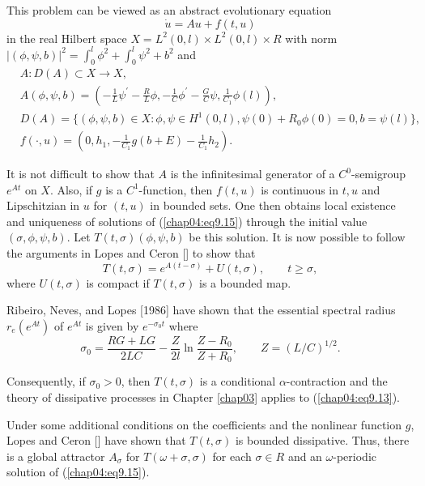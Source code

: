 \documentclass{surv-l}
\theoremstyle{plain}
\theoremstyle{definition}
\numberwithin{equation}{section}
\numberwithin{figure}{chapter}
\begin{document}
This problem can be viewed as an abstract evolutionary equation
\begin{equation}\label{chap04:eq9.15}
\dot{u}=Au+f(t, u)
\end{equation}
in the real Hilbert space $X=L^{2}(0, l)\times L^{2}(0, l)\times R$ with norm $|(\phi, \psi, b)|^{2}= \int_{0}^{l}\phi^{2}+\int_{0}^{l}\psi^{2}+b^{2}$ and
\begin{align*}
& A: D(A)\subset X\rightarrow X,\\
& A(\phi, \psi, b)=\left(-\frac{1}{L}\psi^{\prime} -\frac{R}{L}\phi, -\frac{1}{C}\phi^{\prime} -\frac{G}{C}\psi, \frac{1}{C_{1}}\phi(l)\right),\\
& D(A)=\{(\phi, \psi, b)\in X: \phi, \psi\in H^{1}(0, l), \psi(0)+R_{0}\phi(0)=0, b=\psi(l)\},\\
& f(\cdot, u)=\left(0, h_{1}, -\frac{1}{C_{1}}g(b+E)-\frac{1}{C_{1}}h_{2}\right).
\end{align*}

It is not difficult to show that $A$ is the infinitesimal generator of a $C^{0}$-semigroup $e^{At}$ on $X$. Also, if $g$ is a $C^{1}$-function, then $f(t, u)$ is continuous in $t, u$ and Lipschitzian in $u$ for $(t, u)$ in bounded sets. One then obtains local existence and uniqueness of solutions of (\ref{chap04:eq9.15}) through the initial value $(\sigma, \phi, \psi, b)$. Let $T(t, \sigma)(\phi, \psi, b)$ be this solution. It is now possible to follow the arguments in Lopes and Ceron [\citeyear{1984lc}] to show that
\begin{equation*}
T(t, \sigma)=e^{A(t-\sigma)}+U(t, \sigma),\qquad t\geq\sigma,
\end{equation*}
where $U(t, \sigma)$ is compact if $T(t, \sigma)$ is a bounded map.

Ribeiro, Neves, and Lopes [1986] have shown that the essential spectral radius $r_{e}(e^{At})$ of $e^{At}$ is given by $e^{-\sigma_{0}t}$ where
\begin{equation*}
\sigma_{0}=\frac{RG+LG}{2LC}-\frac{Z}{2l}\ln\frac{Z-R_{0}}{Z+R_{0}},\qquad Z=(L/C)^{1/2}.
\end{equation*}

Consequently, if $\sigma_{0}>0$, then $T(t, \sigma)$ is a conditional $\alpha$-contraction and the theory of dissipative processes in Chapter \ref{chap03} applies to (\ref{chap04:eq9.13}).

Under some additional conditions on the coefficients and the nonlinear function $g$, Lopes and Ceron [\citeyear{1984lc}] have shown that $T(t, \sigma)$ is bounded dissipative. Thus, there is a global attractor $A_{\sigma}$ for $T(\omega+\sigma, \sigma)$ for each $\sigma\in R$ and an $\omega$-periodic solution of (\ref{chap04:eq9.15}).
\end{document}
